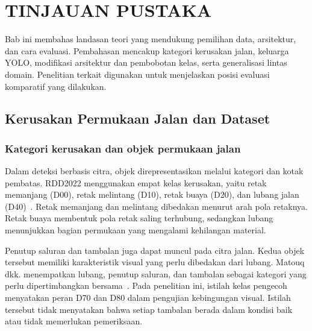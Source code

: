 \chapter{TINJAUAN PUSTAKA}
\label{bab:tinjauan-pustaka}

Bab ini membahas landasan teori yang mendukung pemilihan data, arsitektur, dan cara evaluasi. Pembahasan mencakup kategori kerusakan jalan, keluarga YOLO, modifikasi arsitektur dan pembobotan kelas, serta generalisasi lintas domain. Penelitian terkait digunakan untuk menjelaskan posisi evaluasi komparatif yang dilakukan.

\section{Kerusakan Permukaan Jalan dan Dataset}
\subsection{Kategori kerusakan dan objek permukaan jalan}
Dalam deteksi berbasis citra, objek direpresentasikan melalui kategori dan kotak pembatas. RDD2022 menggunakan empat kelas kerusakan, yaitu retak memanjang (D00), retak melintang (D10), retak buaya (D20), dan lubang jalan (D40)~\cite{Arya2024846}. Retak memanjang dan melintang dibedakan menurut arah pola retaknya. Retak buaya membentuk pola retak saling terhubung, sedangkan lubang menunjukkan bagian permukaan yang mengalami kehilangan material.

Penutup saluran dan tambalan juga dapat muncul pada citra jalan. Kedua objek tersebut memiliki karakteristik visual yang perlu dibedakan dari lubang. Matouq dkk. menempatkan lubang, penutup saluran, dan tambalan sebagai kategori yang perlu dipertimbangkan bersama~\cite{matouq2024ai}. Pada penelitian ini, istilah kelas pengecoh menyatakan peran D70 dan D80 dalam pengujian kebingungan visual. Istilah tersebut tidak menyatakan bahwa setiap tambalan berada dalam kondisi baik atau tidak memerlukan pemeriksaan.

